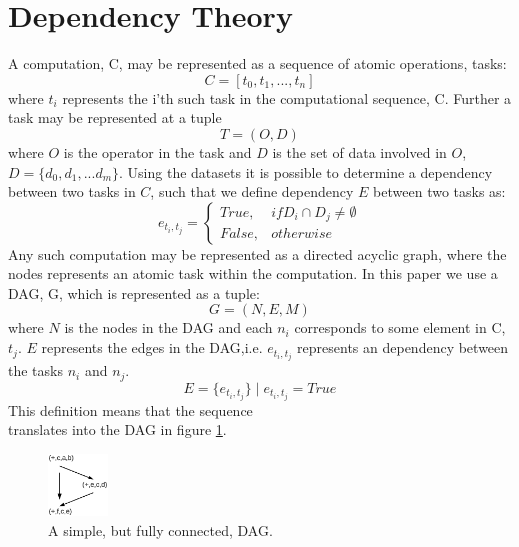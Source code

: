\documentclass[preprint]{../PGAS10/sigplanconf}
\begin{document}
\section{Dependency Theory}
A computation, C, may be represented as a sequence of atomic operations, tasks:
\begin{equation*}
C=[t_0,t_1,...,t_n]
\end{equation*}
where $t_i$ represents the i'th such task in the computational sequence, C. Further a task may be represented at a tuple
\begin{equation*}
T=(O,D)
\end{equation*}
where $O$ is the operator in the task and $D$ is the set of data involved in $O$, $D=\{d_0,d_1,...d_m\}$. Using the datasets it is possible to determine a dependency between two tasks in $C$, such that we define dependency $E$ between two tasks as:
\begin{equation*}
e_{t_i, t_j} = 
 \left\{
	\begin{matrix}
        True, & if D_i \cap D_j \neq \emptyset\\
        False, & otherwise
    \end{matrix}
 \right.
\end{equation*}
Any such computation may be represented as a directed acyclic graph, where the nodes represents an atomic task within the computation. In this paper we use a DAG, G, which is represented as a tuple:
\begin{equation*}
G=(N,E,M)
\end{equation*}
where $N$ is the nodes in the DAG and each $n_i$ corresponds to some element in C, $t_j$. $E$ represents the edges in the DAG,i.e. $e_{t_i,t_j}$ represents an dependency between the tasks $n_i$ and $n_j$.
\begin{equation*}
E = \{e_{t_i,t_j}\} \mid e_{t_i,t_j}=True
\end{equation*}
This definition means that the sequence
\begin{equation*}
[(+,c,a,b),(+,e,c,d),(f,c,e)]
\end{equation*}
translates into the DAG in figure \ref{fig:dag_theory1}.


\begin{figure}
 \centering
 \includegraphics[width=60px]{gfx/dag_theory1}
 \caption{A simple, but fully connected, DAG.}
 \label{fig:dag_theory1}
\end{figure}
\end{document}
